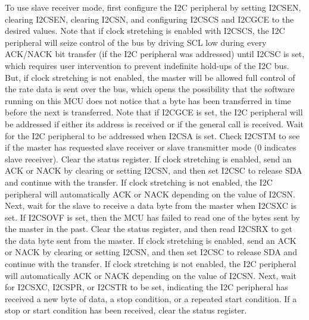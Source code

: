 To use slave receiver mode, first configure the I2C peripheral by setting I2CSEN, clearing I2CSEN, clearing I2CSN, and configuring I2CSCS and I2CGCE to the desired values. Note that if clock stretching is enabled with I2CSCS, the I2C peripheral will seize control of the bus by driving SCL low during every ACK/NACK bit transfer (if the I2C peripheral was addressed) until I2CSC is set, which requires user intervention to prevent indefinite hold-ups of the I2C bus. But, if clock stretching is not enabled, the master will be allowed full control of the rate data is sent over the bus, which opens the possibility that the software running on this MCU does not notice that a byte has been transferred in time before the next is transferred. Note that if I2CGCE is set, the I2C peripheral will be addressed if either its address is received or if the general call is received. Wait for the I2C peripheral to be addressed when I2CSA is set. Check I2CSTM to see if the master has requested slave receiver or slave transmitter mode (0 indicates slave receiver). Clear the status register. If clock stretching is enabled, send an ACK or NACK by clearing or setting I2CSN, and then set I2CSC to release SDA and continue with the transfer. If clock stretching is not enabled, the I2C peripheral will automatically ACK or NACK depending on the value of I2CSN. Next, wait for the slave to receive a data byte from the master when I2CSXC is set. If I2CSOVF is set, then the MCU has failed to read one of the bytes sent by the master in the past. Clear the status register, and then read I2CSRX to get the data byte sent from the master. If clock stretching is enabled, send an ACK or NACK by clearing or setting I2CSN, and then set I2CSC to release SDA and continue with the transfer. If clock stretching is not enabled, the I2C peripheral will automatically ACK or NACK depending on the value of I2CSN. Next, wait for I2CSXC, I2CSPR, or I2CSTR to be set, indicating the I2C peripheral has received a new byte of data, a stop condition, or a repeated start condition. If a stop or start condition has been received, clear the status register.

